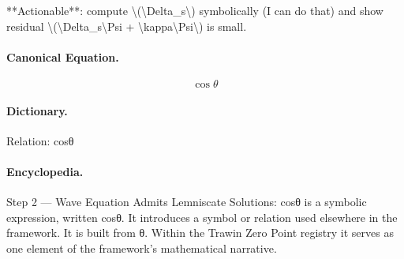 **Actionable**: compute \textbackslash{}(\textbackslash{}Delta\_s\textbackslash{}) symbolically (I can do that) and show residual \textbackslash{}(\textbackslash{}Delta\_s\textbackslash{}Psi + \textbackslash{}kappa\textbackslash{}Psi\textbackslash{}) is small.

\paragraph{Canonical Equation.}
\[
\cos\theta
\]

\paragraph{Dictionary.}
Relation: cosθ

\paragraph{Encyclopedia.}
Step 2 — Wave Equation Admits Lemniscate Solutions: cosθ is a symbolic expression, written cosθ. It introduces a symbol or relation used elsewhere in the framework. It is built from θ. Within the Trawin Zero Point registry it serves as one element of the framework's mathematical narrative.
